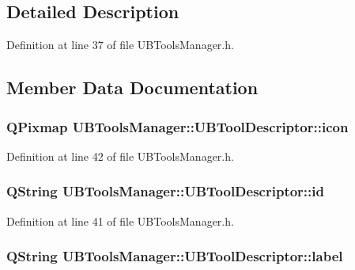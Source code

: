 \subsection{Detailed Description}


Definition at line 37 of file U\-B\-Tools\-Manager.\-h.



\subsection{Member Data Documentation}
\hypertarget{class_u_b_tools_manager_1_1_u_b_tool_descriptor_a2c59dca8e19715a1e987111c27a7548c}{
\subsubsection[{icon}]{\setlength{\rightskip}{0pt plus 5cm}Q\-Pixmap U\-B\-Tools\-Manager\-::\-U\-B\-Tool\-Descriptor\-::icon}}\label{d9/d66/class_u_b_tools_manager_1_1_u_b_tool_descriptor_a2c59dca8e19715a1e987111c27a7548c}


Definition at line 42 of file U\-B\-Tools\-Manager.\-h.

\hypertarget{class_u_b_tools_manager_1_1_u_b_tool_descriptor_ab638247040d512615c8bded4d5559fea}{
\subsubsection[{id}]{\setlength{\rightskip}{0pt plus 5cm}Q\-String U\-B\-Tools\-Manager\-::\-U\-B\-Tool\-Descriptor\-::id}}\label{d9/d66/class_u_b_tools_manager_1_1_u_b_tool_descriptor_ab638247040d512615c8bded4d5559fea}


Definition at line 41 of file U\-B\-Tools\-Manager.\-h.

\hypertarget{class_u_b_tools_manager_1_1_u_b_tool_descriptor_adefbcf24efe89a56bfc62808d18255a1}{
\subsubsection[{label}]{\setlength{\rightskip}{0pt plus 5cm}Q\-String U\-B\-Tools\-Manager\-::\-U\-B\-Tool\-Descriptor\-::label}}\label{d9/d66/class_u_b_tools_manager_1_1_u_b_tool_descriptor_adefbcf24efe89a56bfc62808d18255a1}


